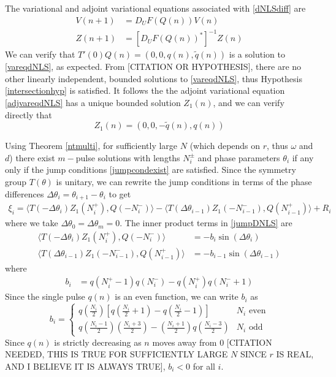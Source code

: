 \documentclass[12pt]{article}
\begin{document}
The variational and adjoint variational equations associated with \eqref{dNLSdiff} are
\begin{align}
V(n+1) &= D_U F(Q(n)) V(n) \label{vareqdNLS} \\
Z(n+1) &= [D_U F(Q(n))^*]^{-1} Z(n) \label{adjvareqdNLS}
\end{align}
We can verify that $T'(0) Q(n) = (0, 0, q(n), \tilde{q}(n))$ is a solution to \eqref{vareqdNLS}, as expected. From [CITATION OR HYPOTHESIS], there are no other linearly independent, bounded solutions to \eqref{vareqdNLS}, thus Hypothesis \ref{intersectionhyp} is satisfied. It follows the the adjoint variational equation \eqref{adjvareqdNLS} has a unique bounded solution $Z_1(n)$, and we can verify directly that
\begin{equation}\label{defZ1}
Z_1(n) = (0, 0, -\tilde{q}(n), q(n))
\end{equation}

Using Theorem \ref{ntmulti}, for sufficiently large $N$ (which depends on $r$, thus $\omega$ and $d$) there exist $m-$pulse solutions with lengths $N_i^\pm$ and phase parameters $\theta_i$ if any only if the jump conditions \eqref{jumpcondexist} are satisfied. Since the symmetry group $T(\theta)$ is unitary, we can rewrite the jump conditions in terms of the phase differences $\Delta \theta_i = \theta_{i+1} - \theta_i$ to get
\begin{align}\label{jumpDNLS}
\xi_i = \langle T(-\Delta \theta_i) Z_1(N_i^+), Q(-N_i^-) \rangle
- \langle T(\Delta \theta_{i-1}) Z_1(-N_{i-1}^-), Q(N_{i-1}^+) \rangle + R_i
\end{align}
where we take $\Delta \theta_0 = \Delta \theta_m = 0$. The inner product terms in \eqref{jumpDNLS} are
\begin{equation}\label{jumpIPs}
\begin{aligned}
\langle T(-\Delta\theta_i) Z_1(N_i^+), Q(-N_i^-) \rangle 
&= -b_i \sin(\Delta\theta_i) \\
\langle T(\Delta\theta_{i-1}) Z_1(-N_{i-1}^-), Q(N_{i-1}^+) \rangle &= -b_{i-1} \sin(\Delta\theta_{i-1})
\end{aligned}
\end{equation}
where 
\begin{align*}
b_i &= q(N_i^+ - 1)q(N_i^-) - q(N_i^+)q(N_i^- + 1)
\end{align*}
Since the single pulse $q(n)$ is an even function, we can write $b_i$ as
\begin{equation}\label{bieq}
b_i = \begin{cases}
q\left(\frac{N_i}{2}\right) \left[ q\left(\frac{N_i}{2} + 1\right) - q\left(\frac{N_i}{2} - 1\right) \right] & N_i \text{ even} \\
q\left(\frac{N_i-1}{2}\right)\left(\frac{N_i+3}{2}\right) 
- \left(\frac{N_i+1}{2}\right)q\left(\frac{N_i-3}{2}\right) & N_i \text{ odd}
\end{cases}
\end{equation}
Since $q(n)$ is strictly decreasing as $n$ moves away from 0 [CITATION NEEDED, THIS IS TRUE FOR SUFFICIENTLY LARGE $N$ SINCE $r$ IS REAL, AND I BELIEVE IT IS ALWAYS TRUE], $b_i < 0$ for all $i$. 
\end{document}
